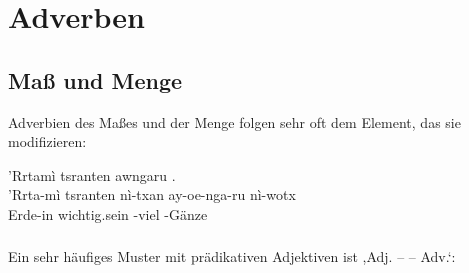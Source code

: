 %
%

\section{Adverben}

\subsection{Maß und Menge} Adverbien des Maßes und der Menge folgen sehr oft dem Element, das sie modifizieren:

\begin{interlin}
	\glll \Npawl{}'Rrtamì tsranten  awngaru . \\
	'Rrta-mì tsranten nì-txan ay-oe-nga-ru nì-wotx \\
	Erde-in wichtig.sein -viel  -Gänze \\
\end{interlin}

\subsubsection{} Ein sehr häufiges Muster mit prädikativen Adjektiven ist ,Adj. --  -- Adv.‘: 

